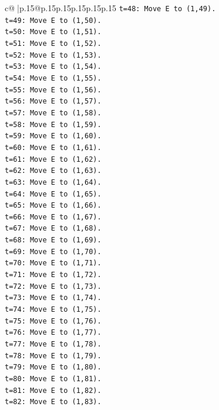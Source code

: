 \documentclass{article}
\begin{document}
{\begin{supertabular}{c@{$\;$}|p{.15\linewidth}@{}p{.15\linewidth}p{.15\linewidth}p{.15\linewidth}p{.15\linewidth}p{.15\linewidth}}
{{{\texttt{t=48: Move E to (1,49).} \\
\texttt{t=49: Move E to (1,50).} \\
\texttt{t=50: Move E to (1,51).} \\
\texttt{t=51: Move E to (1,52).} \\
\texttt{t=52: Move E to (1,53).} \\
\texttt{t=53: Move E to (1,54).} \\
\texttt{t=54: Move E to (1,55).} \\
\texttt{t=55: Move E to (1,56).} \\
\texttt{t=56: Move E to (1,57).} \\
\texttt{t=57: Move E to (1,58).} \\
\texttt{t=58: Move E to (1,59).} \\
\texttt{t=59: Move E to (1,60).} \\
\texttt{t=60: Move E to (1,61).} \\
\texttt{t=61: Move E to (1,62).} \\
\texttt{t=62: Move E to (1,63).} \\
\texttt{t=63: Move E to (1,64).} \\
\texttt{t=64: Move E to (1,65).} \\
\texttt{t=65: Move E to (1,66).} \\
\texttt{t=66: Move E to (1,67).} \\
\texttt{t=67: Move E to (1,68).} \\
\texttt{t=68: Move E to (1,69).} \\
\texttt{t=69: Move E to (1,70).} \\
\texttt{t=70: Move E to (1,71).} \\
\texttt{t=71: Move E to (1,72).} \\
\texttt{t=72: Move E to (1,73).} \\
\texttt{t=73: Move E to (1,74).} \\
\texttt{t=74: Move E to (1,75).} \\
\texttt{t=75: Move E to (1,76).} \\
\texttt{t=76: Move E to (1,77).} \\
\texttt{t=77: Move E to (1,78).} \\
\texttt{t=78: Move E to (1,79).} \\
\texttt{t=79: Move E to (1,80).} \\
\texttt{t=80: Move E to (1,81).} \\
\texttt{t=81: Move E to (1,82).} \\
\texttt{t=82: Move E to (1,83).} \\
}}}
\end{supertabular}}
\end{document}
